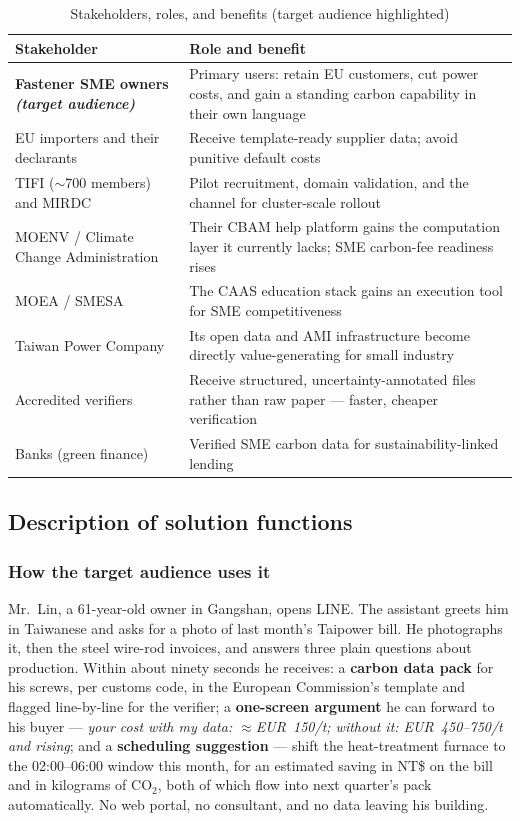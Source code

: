 \begin{table}[htbp]
\caption{Stakeholders, roles, and benefits (target audience highlighted)}
\label{tab:stakeholders}
\small
\begin{tabularx}{\textwidth}{@{}p{}X@{}}
\toprule
\textbf{Stakeholder} & \textbf{Role and benefit} \\
\midrule
\textbf{Fastener SME owners \emph{(target audience)}} & Primary users: retain EU customers, cut power costs, and gain a standing carbon capability in their own language \\
EU importers and their declarants & Receive template-ready supplier data; avoid punitive default costs\cite{omm} \\
TIFI ($\sim$700 members) and MIRDC & Pilot recruitment, domain validation, and the channel for cluster-scale rollout\cite{goebel} \\
MOENV / Climate Change Administration & Their CBAM help platform\cite{tpt-cbam} gains the computation layer it currently lacks; SME carbon-fee readiness rises \\
MOEA / SMESA & The CAAS education stack\cite{caas} gains an execution tool for SME competitiveness \\
Taiwan Power Company & Its open data and AMI infrastructure\cite{taipower,taipowerdata} become directly value-generating for small industry \\
Accredited verifiers & Receive structured, uncertainty-annotated files rather than raw paper --- faster, cheaper verification \\
Banks (green finance) & Verified SME carbon data for sustainability-linked lending \\
\bottomrule
\end{tabularx}
\end{table}

\subsection{Description of solution functions}\label{sec:solution}

\subsubsection*{How the target audience uses it}

Mr.~Lin, a 61-year-old owner in Gangshan, opens LINE. The assistant greets him
in Taiwanese and asks for a photo of last month's Taipower bill. He photographs
it, then the steel wire-rod invoices, and answers three plain questions about
production. Within about ninety seconds he receives: a \textbf{carbon data
pack} for his screws, per customs code, in the European Commission's template
and flagged line-by-line for the verifier; a \textbf{one-screen argument} he
can forward to his buyer --- \emph{your cost with my data: $\approx$EUR~150/t;
without it: EUR~450--750/t and rising}; and a \textbf{scheduling suggestion} ---
shift the heat-treatment furnace to the 02:00--06:00 window this month, for an
estimated saving in NT\$ on the bill and in kilograms of CO$_2$, both of which
flow into next quarter's pack automatically. No web portal, no consultant, and
no data leaving his building.


